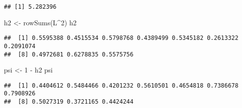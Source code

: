 \documentclass[
]{article}
\newenvironment{Shaded}{\begin{snugshade}}{\end{snugshade}}
\newcommand{\CommentTok}[1]{\textcolor[rgb]{0.56,0.35,0.01}{\textit{#1}}}
\newcommand{\DecValTok}[1]{\textcolor[rgb]{0.00,0.00,0.81}{#1}}
\newcommand{\FunctionTok}[1]{\textcolor[rgb]{0.00,0.00,0.00}{#1}}
\newcommand{\NormalTok}[1]{#1}
\newcommand{\OtherTok}[1]{\textcolor[rgb]{0.56,0.35,0.01}{#1}}
\newcommand{\SpecialCharTok}[1]{\textcolor[rgb]{0.00,0.00,0.00}{#1}}
\begin{document}
\begin{Shaded}
\end{Shaded}

\begin{verbatim}
## [1] 5.282396
\end{verbatim}

\begin{Shaded}
\end{Shaded}

\begin{Shaded}
\begin{Highlighting}[]
\NormalTok{h2 }\OtherTok{\textless{}{-}} \FunctionTok{rowSums}\NormalTok{(L}\SpecialCharTok{\^{}}\DecValTok{2}\NormalTok{)}
\NormalTok{h2}
\end{Highlighting}
\end{Shaded}

\begin{verbatim}
##  [1] 0.5595388 0.4515534 0.5798768 0.4389499 0.5345182 0.2613322 0.2091074
##  [8] 0.4972681 0.6278835 0.5575756
\end{verbatim}

\begin{Shaded}
\begin{Highlighting}[]
\NormalTok{psi }\OtherTok{\textless{}{-}} \DecValTok{1} \SpecialCharTok{{-}}\NormalTok{ h2}
\NormalTok{psi}
\end{Highlighting}
\end{Shaded}

\begin{verbatim}
##  [1] 0.4404612 0.5484466 0.4201232 0.5610501 0.4654818 0.7386678 0.7908926
##  [8] 0.5027319 0.3721165 0.4424244
\end{verbatim}
\end{document}
